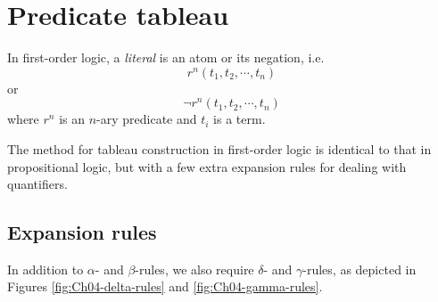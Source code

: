 \section{Predicate tableau}

In first-order logic, a \emph{literal} is an atom or its negation, i.e.
%
\[r^n (t_1, t_2, \cdots, t_n)\]
or
\[\neg r^n (t_1, t_2, \cdots, t_n)\]
%
where \(r^n\) is an \(n\)-ary predicate and \(t_i\) is a term.

The method for tableau construction in first-order logic is identical to that in propositional logic, but with a few extra expansion rules for dealing with quantifiers.


\subsection{Expansion rules}

In addition to \(\alpha\)- and \(\beta\)-rules, we also require \(\delta\)- and \(\gamma\)-rules, as depicted in Figures \ref{fig:Ch04-delta-rules} and \ref{fig:Ch04-gamma-rules}.


